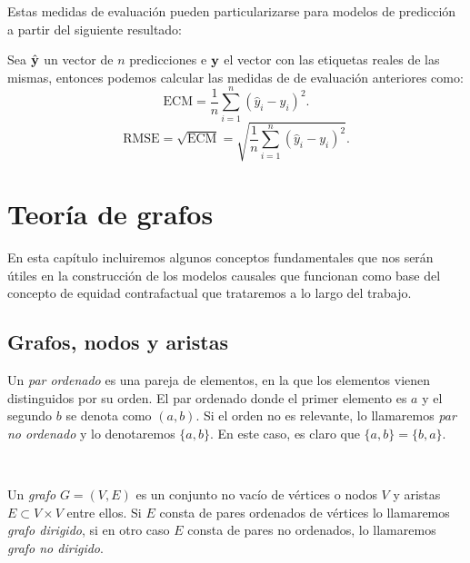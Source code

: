 \documentclass[oneside,openright,titlepage,numbers=noenddot,openany,headinclude,footinclude=true,
cleardoublepage=empty,abstractoff,BCOR=5mm,paper=a4,fontsize=12pt,main=spanish]{scrreprt}
\begin{document}
Estas medidas de evaluación pueden particularizarse para modelos de predicción a partir del siguiente resultado:\\

\begin{proposition}
Sea $\hat{\textbf{y}}$ un vector de $n$ predicciones e $\textbf{y}$ el vector con las etiquetas reales de las mismas, entonces podemos calcular las medidas de de evaluación anteriores como: $$\text{ECM}=\frac{1}{n}\sum_{i=1}^n (\hat{y}_i-y_i)^2.$$ $$\text{RMSE}=\sqrt{\text{ECM}}=\sqrt{\frac{1}{n}\sum_{i=1}^n (\hat{y}_i-y_i)^2}.$$
\end{proposition}

\chapter{Teoría de grafos}

En esta capítulo incluiremos algunos conceptos fundamentales que nos serán útiles en la construcción de los modelos causales que funcionan como base del concepto de equidad contrafactual que trataremos a lo largo del trabajo.

\section{Grafos, nodos y aristas}

\begin{definition}
Un \textit{par ordenado} es una pareja de elementos, en la que los elementos vienen distinguidos por su orden. El par ordenado donde el primer elemento es $a$ y el segundo $b$ se denota como $(a,b)$. Si el orden no es relevante, lo llamaremos \textit{par no ordenado} y lo denotaremos $\{a,b\}$. En este caso, es claro que $\{a,b\}=\{b,a\}$.
\end{definition}\

\begin{definition}[Grafo]
Un \textit{grafo} $G = (V,E)$ es un conjunto no vacío de vértices o nodos $V$ y aristas $E \subset V\times V$ entre ellos.
Si $E$ consta de pares ordenados de vértices lo llamaremos \textit{grafo dirigido}, si en otro caso $E$ consta de pares no ordenados, lo llamaremos \textit{grafo no dirigido}.
\end{definition}\
\end{document}

